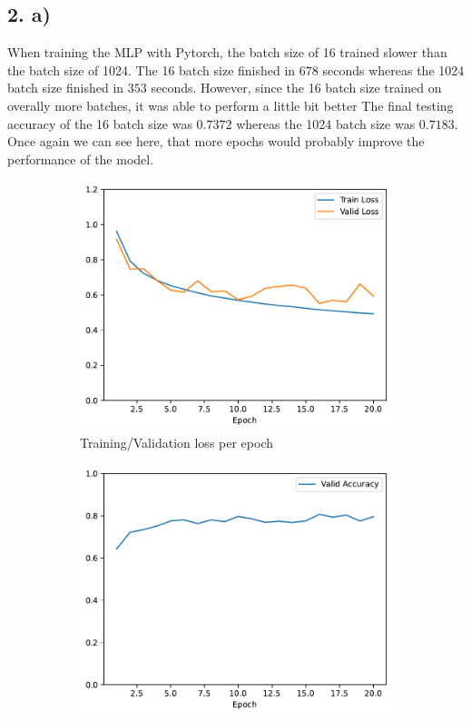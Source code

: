 \documentclass[11pt]{article}
\begin{document}
\pagebreak

\subsection{2. a)}
When training the MLP with Pytorch, the batch size of 16 trained slower than the batch size of 1024.
The 16 batch size finished in $678$ seconds whereas the 1024 batch size finished in $353$ seconds.
However, since the 16 batch size trained on overally more batches, it was able to perform a little bit better
The final testing accuracy of the 16 batch size was $0.7372$ whereas the 1024 batch size was $0.7183$.
Once again we can see here, that more epochs would probably improve the performance of the model.

\begin{figure}[h!]
\centering
\begin{subfigure}{.5\textwidth}
  \centering
  \includegraphics[width=.9\linewidth]{plots/mlp-training-loss-batch-16-lr-0.1-epochs-20-hidden-200-dropout-0-l2-0-layers-1-act-relu-opt-sgd}
  \caption{Training/Validation loss per epoch}
\end{subfigure}%
\begin{subfigure}{.5\textwidth}
  \centering
  \includegraphics[width=.9\linewidth]{plots/mlp-validation-accuracy-batch-16-lr-0.1-epochs-20-hidden-200-dropout-0-l2-0-layers-1-act-relu-opt-sgd}

\end{subfigure}
\end{figure}
\end{document}
